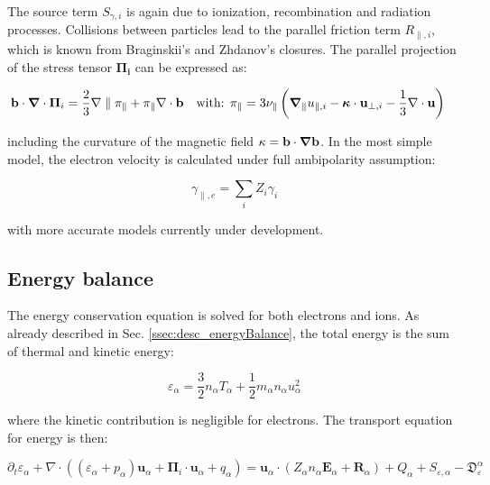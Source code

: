 The source term $S_{\gamma,i}$ is again due to ionization, recombination and radiation processes. Collisions between particles lead to the parallel friction term $R_{\parallel,i}$, which is known from Braginskii's and Zhdanov's closures. The parallel projection of the stress tensor $\mathbf{\Pi_i}$ can be expressed as\cite{braginskii1965transport,zeiler1997nonlinear, helander2005collisional}: 

\begin{align}
	\mathbf{b}\cdot\grad\cdot\boldsymbol{\Pi}_i = \frac{2}{3}\nabla\parallel\pi_\parallel + \pi_\parallel\nabla\cdot\mathbf{b} &&& \text{with: } \pi_\parallel = 3 \nu_\parallel \left( \grad_\parallel u_{\parallel,i} - \boldsymbol{\kappa}\cdot\mathbf{u}_{\perp,i} - \frac{1}{3}\nabla\cdot\mathbf{u} \right)
\end{align}

including the curvature of the magnetic field $\kappa = \mathbf{b}\cdot\grad\mathbf{b}$. In the most simple model, the electron velocity is calculated under full ambipolarity assumption:

\begin{equation}
	\label{eq:S3X_ambipolarity}
	\gamma_{\parallel,e} = \sum_iZ_i\gamma_i
\end{equation}

with more accurate models currently under development. 




\subsection{Energy balance}

The energy conservation equation is solved for both electrons and ions. As already described in Sec. \ref{ssec:desc_energyBalance}, the total energy is the sum of thermal and kinetic energy:

\begin{equation}
	\varepsilon_\alpha = \frac{3}{2} n_\alpha T_\alpha + \frac{1}{2} m_\alpha n_\alpha u_\alpha^2
\end{equation}

where the kinetic contribution is negligible for electrons. The transport equation for energy is then: 

\begin{equation}
	\partial_t \varepsilon_\alpha + \nabla \cdot \left( (\varepsilon_\alpha + p_\alpha)\mathbf{u}_\alpha + \boldsymbol{\Pi}_i\cdot\mathbf{u}_\alpha + q_\alpha \right) = \mathbf{u}_\alpha \cdot \left(Z_\alpha n_\alpha\mathbf{E}_\alpha + \mathbf{R}_\alpha \right) + Q_\alpha + S_{\varepsilon,\alpha} - \mathfrak{D}_\varepsilon^\alpha
\end{equation}

